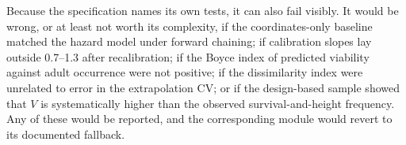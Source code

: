 Because the specification names its own tests, it can also fail visibly. It would be wrong, or at least not worth its complexity, if the coordinates-only baseline matched the hazard model under forward chaining; if calibration slopes lay outside 0.7--1.3 after recalibration; if the Boyce index of predicted viability against adult occurrence were not positive; if the dissimilarity index were unrelated to error in the extrapolation CV; or if the design-based sample showed that $V$ is systematically higher than the observed survival-and-height frequency. Any of these would be reported, and the corresponding module would revert to its documented fallback.
